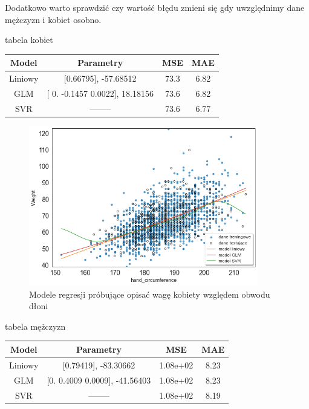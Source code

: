 \documentclass{article}
\begin{document}
\newpage
Dodatkowo warto sprawdzić czy wartość błędu zmieni się gdy uwzględnimy dane mężczyzn i kobiet osobno. 
\begin{center}
tabela kobiet
\end{center}
\begin{center}
\begin{tabular}{ |c|c|c|c| } 
 \hline
 Model & Parametry & MSE & MAE  \\ 
 \hline
 \hline
 Liniowy & [0.66795], -57.68512 & 73.3 & 6.82 \\ 
 \hline
 GLM & [ 0.     -0.1457  0.0022], 18.18156 & 73.6 & 6.82 \\
 \hline
 SVR  & ——– & 73.6 & 6.77   \\
 \hline
\end{tabular}
\end{center}

\begin{figure}[H]
    \centering
    \includegraphics[width=10cm]{modelregresjiwaga_women.png}
    \caption{Modele regresji próbujące opisać wagę kobiety względem obwodu dłoni}
    \label{fig:my_img}
\end{figure}

\newpage
\begin{center}
tabela mężczyzn
\end{center}
\begin{center}
\begin{tabular}{ |c|c|c|c| } 
 \hline
 Model & Parametry & MSE & MAE  \\ 
 \hline
 \hline
 Liniowy & [0.79419], -83.30662 & 1.08e+02 & 8.23 \\ 
 \hline
 GLM & [0.     0.4009 0.0009], -41.56403 & 1.08e+02 & 8.23 \\
 \hline
 SVR  & ——– & 1.08e+02 & 8.19   \\
 \hline
\end{tabular}
\end{center}
\end{document}
